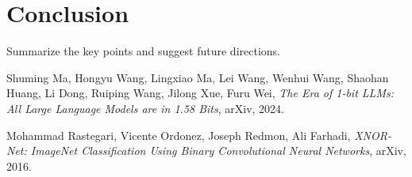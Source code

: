 \documentclass{article}
\theoremstyle{definition}
\theoremstyle{remark}
\begin{document}
\section{Conclusion}
Summarize the key points and suggest future directions.

\begin{thebibliography}{9}

    Shuming Ma, Hongyu Wang, Lingxiao Ma, Lei Wang, Wenhui Wang, Shaohan Huang, Li Dong, Ruiping Wang, Jilong Xue, Furu Wei, \textit{The Era of 1-bit LLMs: All Large Language Models are in 1.58 Bits}, arXiv, 2024.

    Mohammad Rastegari, Vicente Ordonez, Joseph Redmon, Ali Farhadi, \textit{XNOR-Net: ImageNet Classification Using Binary Convolutional Neural Networks}, arXiv, 2016.

\end{thebibliography}
\end{document}
